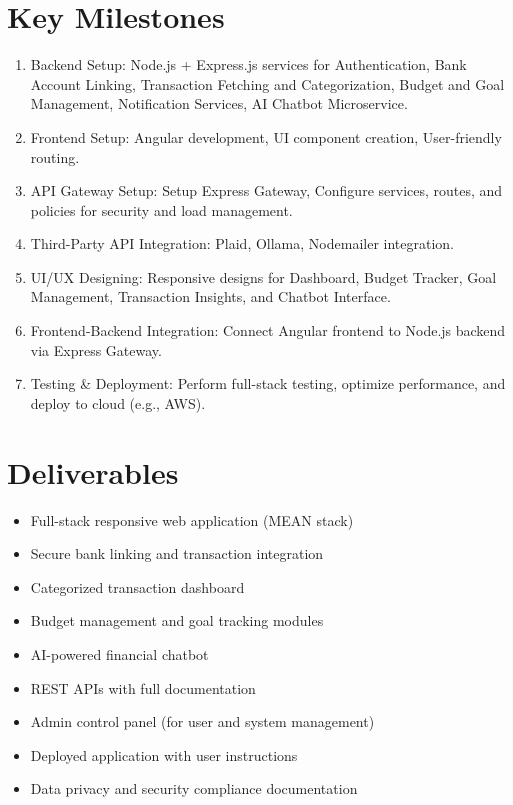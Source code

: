 \documentclass{article}
\begin{document}
\section{Key Milestones}
\begin{enumerate}
    \item Backend Setup: Node.js + Express.js services for Authentication, Bank Account Linking, Transaction Fetching and Categorization, Budget and Goal Management, Notification Services, AI Chatbot Microservice.
    \item Frontend Setup: Angular development, UI component creation, User-friendly routing.
    \item API Gateway Setup: Setup Express Gateway, Configure services, routes, and policies for security and load management.
    \item Third-Party API Integration: Plaid, Ollama, Nodemailer integration.
    \item UI/UX Designing: Responsive designs for Dashboard, Budget Tracker, Goal Management, Transaction Insights, and Chatbot Interface.
    \item Frontend-Backend Integration: Connect Angular frontend to Node.js backend via Express Gateway.
    \item Testing \& Deployment: Perform full-stack testing, optimize performance, and deploy to cloud (e.g., AWS).
\end{enumerate}

\section{Deliverables}
\begin{itemize}
    \item Full-stack responsive web application (MEAN stack)
    \item Secure bank linking and transaction integration
    \item Categorized transaction dashboard
    \item Budget management and goal tracking modules
    \item AI-powered financial chatbot
    \item REST APIs with full documentation
    \item Admin control panel (for user and system management)
    \item Deployed application with user instructions
    \item Data privacy and security compliance documentation
\end{itemize}
\end{document}
